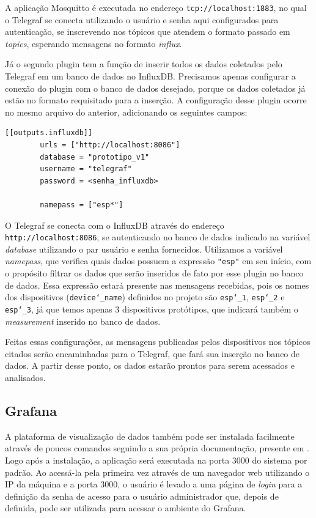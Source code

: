 \documentclass[../monografia.tex]{subfiles}
\begin{document}
A aplicação Mosquitto é executada no endereço \texttt{tcp://localhost:1883}, no qual o Telegraf se conecta utilizando o usuário e senha aqui configurados para autenticação, se inscrevendo nos tópicos que atendem o formato passado em \textit{topics}, esperando mensagens no formato \textit{influx}. 

Já o segundo plugin tem a função de inserir todos os dados coletados pelo Telegraf em um banco de dados no InfluxDB. Precisamos apenas configurar a conexão do plugin com o banco de dados desejado, porque os dados coletados já estão no formato requisitado para a inserção. A configuração desse plugin ocorre no mesmo arquivo do anterior, adicionando os seguintes campos:

\begin{lstlisting}[basicstyle=\small]
	[[outputs.influxdb]]
		urls = ["http://localhost:8086"]
		database = "prototipo_v1"
		username = "telegraf"
		password = <senha_influxdb>

		namepass = ["esp*"]
\end{lstlisting}

O Telegraf se conecta com o InfluxDB através do endereço \texttt{http://localhost:8086}, se autenticando no banco de dados indicado na variável \textit{database} utilizando o par usuário e senha fornecidos. Utilizamos a variável \textit{namepass}, que verifica quais dados possuem a expressão \texttt{"esp"} em seu início, com o propósito filtrar os dados que serão inseridos de fato por esse plugin no banco de dados. Essa expressão estará presente nas mensagens recebidas, pois os nomes dos dispositivos (\texttt{device\char`_name}) definidos no projeto são \texttt{esp\char`_1}, \texttt{esp\char`_2} e \texttt{esp\char`_3}, já que temos apenas 3 dispositivos protótipos, que indicará também o \textit{measurement} inserido no banco de dados. 

Feitas essas configurações, as mensagens publicadas pelos dispositivos nos tópicos citados serão encaminhadas para o Telegraf, que fará sua inserção no banco de dados. A partir desse ponto, os dados estarão prontos para serem acessados e analisados.

\subsection{Grafana}

A plataforma de visualização de dados também pode ser instalada facilmente através de poucos comandos seguindo a sua própria documentação, presente em \cite{grafana-installation}. Logo após a instalação, a aplicação será executada na porta 3000 do sistema por padrão. Ao acessá-la pela primeira vez através de um navegador web utilizando o IP da máquina e a porta 3000, o usuário é levado a uma página de \textit{login} para a definição da senha de acesso para o usuário administrador que, depois de definida, pode ser utilizada para acessar o ambiente do Grafana. 
\end{document}
